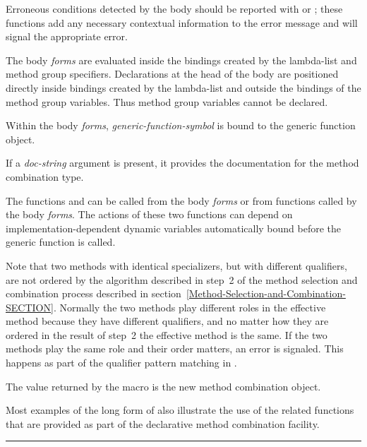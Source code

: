 \begin{defmac}
Erroneous conditions detected by the body should be reported with
 or
; these functions
add any necessary contextual information to the error message and will
signal the appropriate error.

The body \emph{forms\/} are evaluated inside the bindings created by the
lambda-list and method group specifiers.  Declarations at the head of
the body are positioned directly inside bindings created by the
lambda-list and outside the bindings of the method group variables. 
Thus method group variables cannot be declared.

Within the body \emph{forms\/}, \emph{generic-function-symbol}
is bound to the generic function object.

If a \emph{doc-string\/} argument is present, it provides the
documentation for the method combination type.

The functions  and 
 can be called from the body \emph{forms\/} or
from functions called by the body \emph{forms\/}.  The actions of these
two functions can depend on implementation-dependent dynamic variables
automatically bound before the generic function 
 is called.

Note that two methods with identical specializers, but with different
qualifiers, are not ordered by the algorithm described in step~2 of
the method selection and combination process described in
section~\ref{Method-Selection-and-Combination-SECTION}.
Normally the two methods play
different roles in the effective method because they have different
qualifiers, and no matter how they are ordered in the result of step~2
the effective method is the same.  If the two methods play the same
role and their order matters, an error is signaled.  This happens as
part of the qualifier pattern matching in 
.


The value returned by the  macro is the new
method combination object.


Most examples of the long form of  also
illustrate the use of the related functions that are provided as part
of the declarative method combination facility.

\hrule width0pt\relax


\end{defmac}
